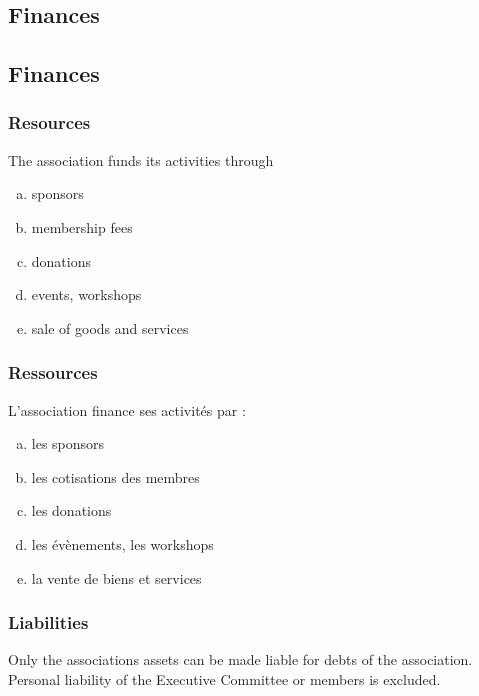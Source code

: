 \documentclass[12pt,a4paper,oneside]{article}
\newcounter{art}
\newcommand{\english}{    \switchcolumn[0]\noindent}
\newcommand{\french}{    \switchcolumn[1]\noindent}
\begin{document}
\begin{paracol}{2}
	\vspace{2cm}



\english
	\subsection{Finances}

\french
	\subsection{Finances}

	\english
	\subsubsection{Resources}
	The association funds its activities through 

	\begin{enumerate}[(a)]
	\item sponsors
	\item membership fees
	\item donations
	\item events, workshops
	\item sale of goods and services
	\end{enumerate}
	\vspace{0.27cm}


	\french
	\subsubsection{Ressources}
	L’association finance ses activités par :
	\begin{enumerate}[(a)]
	\item les sponsors
	\item les cotisations des membres
	\item les donations
	\item les évènements, les workshops
	\item la vente de biens et services
	\end{enumerate}



	\english
	\subsubsection{Liabilities}
	Only the associations assets can be made liable for debts of the association. Personal liability of the Executive Committee or members is excluded.
		\vspace{1.5cm}




\end{paracol}
\end{document}
